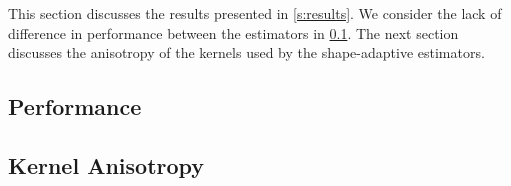 This section discusses the results presented in \cref{s:results}. We consider the lack of difference in performance between the estimators in \cref{s:discussion:performance}. The next section discusses the anisotropy of the kernels used by the shape-adaptive estimators. 

\subsection{Performance}
\label{s:discussion:performance}


\subsection{Kernel Anisotropy}
\label{s:discussion:anisotropy}


